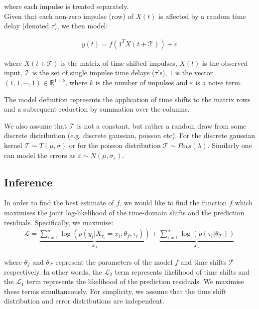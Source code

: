 \documentclass[11pt]{amsart}
\theoremstyle{definition}
\theoremstyle{definition}
\begin{document}
where each impulse is treated separately. \\

Given that each non-zero impulse (row) of $X(t)$ is affected by a random time delay (denoted $\tau$), we then model:

\begin{align}\label{Eqn:ModelSpecification}
y(t)= f(1^TX(t + \mathcal{T})) + \varepsilon
\end{align}

where $X(t + \mathcal{T})$ is the matrix of time shifted impulses, $X(t)$ is the observed input, $\mathcal{T}$ is the set of single impulse time delays ($\tau$'s), $1$ is the vector $(1,1,\cdots, 1)\in 
\mathbb{R}^{1 \times k}$, where $k$ is the number of impulses and $\varepsilon$ is a noise term. 

The model definition represents the application of time shifts to the matrix rows and a subsequent reduction by summation over the columns. 

We also assume that $\mathcal{T}$ is not a constant, but rather a random draw from some discrete distribution (e.g. discrete gaussian, poisson etc). For the discrete gaussian kernel $\mathcal{T}\sim T(\mu, \sigma)$ or for the poisson distribution $\mathcal{T}\sim Pois(\lambda)$. Similarly one can model the errors as  $\varepsilon \sim N(\mu, \sigma_{\varepsilon})$. 
\subsection{Inference}

In order to find the best estimate of $f$, we would like to find the function $f$ which maximises the joint log-likelihood of the time-domain shifts and the prediction residuals. Specifically, we maximise:
\begin{align}
    \mathcal{L} = 
    \underbrace{\sum_{i=1}^{n} \log(p(y_i | X_{\tau_i} = x_i; \theta_{f}, \tau_i))}_{\mathcal{L}_1} 
    + 
    \underbrace{\sum_{i=1}^{n} \log(p(\tau_i| \theta_{\mathcal{T}}))}_{\mathcal{L}_2}
\end{align}

where $\theta_{f}$ and $\theta_{\mathcal{T}}$ represent the parameters of the model $f$ and time shifts $\mathcal{T}$ respectively. In other words, the $\mathcal{L}_2$ term represents likelihood of time shifts and the $\mathcal{L}_1$ term represents the likelihood of the prediction residuals. We maximise these terms simultaneously. For simplicity, we assume that the time shift distribution and error distributions are independent. 
\end{document}
